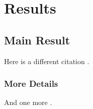 \chapter{Results}

\section{Main Result}
Here is a different citation .  

\subsection{More Details}

And one more .



